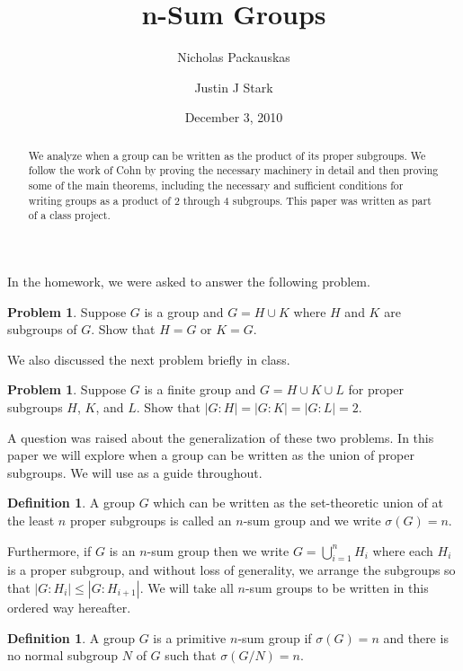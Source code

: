 \documentclass[12pt]{amsart}
\title{n-Sum Groups}
\author{Nicholas Packauskas}
\author{Justin J Stark}
\date{December 3, 2010}
\theoremstyle{definition}
\newtheorem{problem}[theorem]{Problem}
\newtheorem{definition}[theorem]{Definition}
\theoremstyle{remark}
\begin{document}
\begin{abstract}
We analyze when a group can be written as the product of its proper subgroups.  We follow the work of Cohn by proving the necessary machinery in detail and then proving some of the main theorems, including the necessary and sufficient conditions for writing groups as a product of \( 2 \) through \( 4 \) subgroups.  This paper was written as part of a class project.
\end{abstract}

\maketitle
 
In the homework, we were asked to answer the following problem.

\begin{problem}
\label{pr.2sum}
Suppose \( G \) is a group and \( G = H \cup K \) where \( H \) and \( K \) are subgroups of \( G \).  Show that \( H = G \) or \( K = G \).
\end{problem}

We also discussed the next problem briefly in class.

\begin{problem}
\label{pr.3sum}
Suppose \( G \) is a finite group and \( G = H \cup K \cup L \) for proper subgroups \( H \), \( K \), and \( L \).  Show that \( |G:H| = |G:K| = |G:L| = 2 \).
\end{problem}

A question was raised about the generalization of these two problems.  In this paper we will explore when a group can be written as the union of proper subgroups.  We will use \cite{JHCo94} as a guide throughout.
 
\begin{definition}
A group \( G \) which can be written as the set-theoretic union of at the least \( n \) proper subgroups is called an \( n \)-sum group and we write \( \sigma(G) = n \).
\end{definition}

Furthermore, if \( G \) is an \(n\)-sum group then we write \( G = \bigcup_{i = 1}^{n} H_i \) where each \(H_i\) is a proper subgroup, and without loss of generality, we arrange the subgroups so that \( |G:H_i| \leq |G: H_{i+1}|\).  We will take all \(n\)-sum groups to be written in this ordered way hereafter.

\begin{definition}
A group \( G \) is a primitive \( n \)-sum group if \( \sigma(G) = n \) and there is no normal subgroup \( N \) of \( G \) such that \( \sigma(G/N) = n \).
\end{definition}
\end{document}
